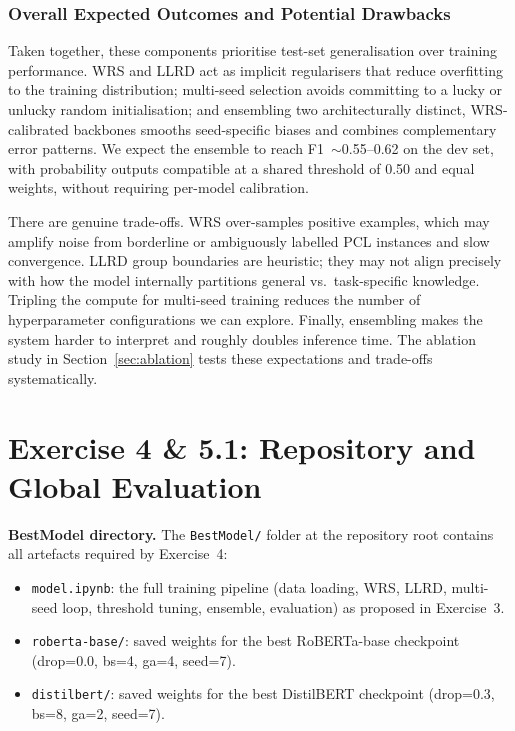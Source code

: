 \documentclass[11pt]{article}
\begin{document}
\subsubsection*{Overall Expected Outcomes and Potential Drawbacks}

Taken together, these components prioritise test-set generalisation over training performance. WRS and LLRD act as implicit regularisers that reduce overfitting to the training distribution; multi-seed selection avoids committing to a lucky or unlucky random initialisation; and ensembling two architecturally distinct, WRS-calibrated backbones smooths seed-specific biases and combines complementary error patterns. We expect the ensemble to reach F1~$\sim$0.55--0.62 on the dev set, with probability outputs compatible at a shared threshold of 0.50 and equal weights, without requiring per-model calibration.

There are genuine trade-offs. WRS over-samples positive examples, which may amplify noise from borderline or ambiguously labelled PCL instances and slow convergence. LLRD group boundaries are heuristic; they may not align precisely with how the model internally partitions general vs.\ task-specific knowledge. Tripling the compute for multi-seed training reduces the number of hyperparameter configurations we can explore. Finally, ensembling makes the system harder to interpret and roughly doubles inference time. The ablation study in Section~\ref{sec:ablation} tests these expectations and trade-offs systematically.

\clearpage
\section{Exercise 4 \& 5.1: Repository and Global Evaluation}

\textbf{BestModel directory.} The \texttt{BestModel/} folder at the repository root contains all artefacts required by Exercise~4:

\begin{itemize}[noitemsep]
    \item \texttt{model.ipynb}: the full training pipeline (data loading, WRS, LLRD, multi-seed loop, threshold tuning, ensemble, evaluation) as proposed in Exercise~3.
    \item \texttt{roberta-base/}: saved weights for the best RoBERTa-base checkpoint (drop=0.0, bs=4, ga=4, seed=7).
    \item \texttt{distilbert/}: saved weights for the best DistilBERT checkpoint (drop=0.3, bs=8, ga=2, seed=7).
\end{itemize}
\end{document}
